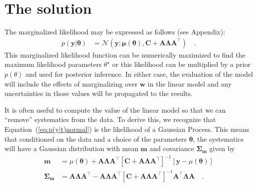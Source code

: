 \documentclass[modern]{rnaastex}
\renewcommand{\eqref}[1]{\ref{eq:#1}}
\newcommand{\Eq}[1]{Equation~(\eqref{#1})}
\newcommand{\eq}[1]{\Eq{#1}}
\newcommand{\eqlabel}[1]{\label{eq:#1}}
\newcommand{\bvec}[1]{{\ensuremath{\boldsymbol{#1}}}}
\newcommand{\Normal}{\ensuremath{\mathcal{N}}}
\newcommand{\mA}{\ensuremath{\bvec{A}}}
\newcommand{\mC}{\ensuremath{\bvec{C}}}
\newcommand{\mL}{\ensuremath{\bvec{\Lambda}}}
\newcommand{\vy}{\ensuremath{\bvec{y}}}
\newcommand{\vt}{\ensuremath{\bvec{\theta}}}
\newcommand{\vm}{\ensuremath{\bvec{\mu}(\bvec{\theta})}}
\begin{document}
\section{The solution}

The marginalized likelihood may be expressed as follows (see Appendix):
%
\begin{align}
\eqlabel{p(y|t)normal}
p(\vy | \vt) &= \Normal (\vy; \vm, \mC + \mA \mL \mA^\top) \quad.
\end{align}
%
This marginalized likelihood function can be numerically maximized to find the
maximum likelihood parameters $\theta^\star$ or this likelihood can be
multiplied by a prior $p(\theta)$ and used for posterior inference.
In either case, the evaluation of the model will include the effects of
marginalizing over $\bvec{w}$ in the linear model and any uncertainties in
those values will be propagated to the results.

It is often useful to compute the value of the linear model so that we can
``remove'' systematics from the data.
To derive this, we recognize that \eq{p(y|t)normal} is the likelihood of a
Gaussian Process.
This means that conditioned on the data and a choice of the parameters
$\bvec{\theta}$, the systematics will have a Gaussian distribution with mean
$\bvec{m}$ and covariance $\bvec{\Sigma}_\bvec{m}$ given by
\citep{Rasmussen:2006}
%
\begin{align}\eqlabel{pred}
\bvec{m} &= \mu(\bvec{\theta}) + \mA \mL \mA^\top  \left[\mC +
    \mA \mL \mA^\top\right]^{-1} \left[\bvec{y} - \mu(\bvec{\theta})\right]
    \nonumber\\
\bvec{\Sigma}_\bvec{m} &= \mA \mL \mA^\top - \mA \mL \mA^\top
    \left[\mC + \mA \mL \mA^\top\right]^{-1}
    \mA^\top \mL \mA \quad.
\end{align}
\end{document}
